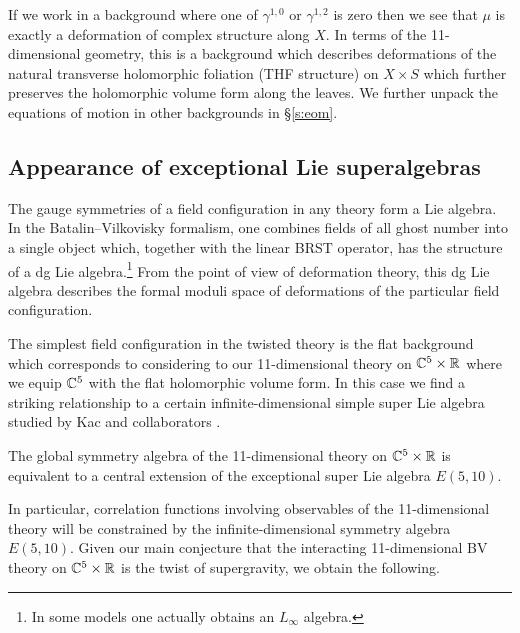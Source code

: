 If we work in a background where one of $\gamma^{1,0}$ or $\gamma^{1,2}$ is zero then we see that $\mu$ is exactly a deformation of complex structure along $X$. 
In terms of the 11-dimensional geometry, this is a background which describes deformations of the natural transverse holomorphic foliation (THF structure) on $X \times S$ which further preserves the holomorphic volume form along the leaves.
We further unpack the equations of motion in other backgrounds in \S \ref{s:eom}.


\subsection*{Appearance of exceptional Lie superalgebras}

The gauge symmetries of a field configuration in any theory form a Lie algebra. 
In the Batalin--Vilkovisky formalism, one combines fields of all ghost number into a single object which, together with the linear BRST operator, has the structure of a dg Lie algebra.\footnote{In some models one actually obtains an $L_\infty$ algebra.} 
From the point of view of deformation theory, this dg Lie algebra describes the formal moduli space of deformations of the particular field configuration. 

The simplest field configuration in the twisted theory is the flat background which corresponds to considering to our 11-dimensional theory on $\mathbb C^5 \times \mathbb R$ where we equip $\mathbb C^5$ with the flat holomorphic volume form. 
In this case we find a striking relationship to a certain infinite-dimensional simple super Lie algebra studied by Kac and collaborators \cite{KacBible,KacE510}.

\begin{thm}
The global symmetry algebra of the 11-dimensional theory on $\mathbb C^5 \times \mathbb R$ is equivalent to a central extension of the exceptional super Lie algebra $E(5,10)$. 
\end{thm}

In particular, correlation functions involving observables of the 11-dimensional theory will be constrained by the infinite-dimensional symmetry algebra $E(5,10)$. 
Given our main conjecture that the interacting 11-dimensional BV theory on $\mathbb C^5 \times \mathbb R$ is the twist of supergravity, we obtain the following.


